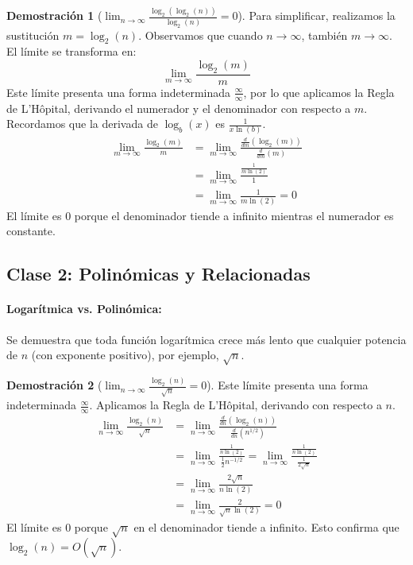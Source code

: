 \documentclass[12pt, a4paper]{article}
\theoremstyle{definition}
\newtheorem{demo}{Demostración}
\begin{document}
\begin{demo}[$\lim_{n \to \infty} \frac{\log_2(\log_2(n))}{\log_2(n)} = 0$]
Para simplificar, realizamos la sustitución $m = \log_2(n)$. Observamos que cuando $n \to \infty$, también $m \to \infty$. El límite se transforma en:
\[ \lim_{m \to \infty} \frac{\log_2(m)}{m} \]
Este límite presenta una forma indeterminada $\frac{\infty}{\infty}$, por lo que aplicamos la Regla de L'Hôpital, derivando el numerador y el denominador con respecto a $m$. Recordamos que la derivada de $\log_b(x)$ es $\frac{1}{x \ln(b)}$.
\begin{align*}
    \lim_{m \to \infty} \frac{\log_2(m)}{m} &= \lim_{m \to \infty} \frac{\frac{d}{dm}(\log_2(m))}{\frac{d}{dm}(m)} \\
    &= \lim_{m \to \infty} \frac{\frac{1}{m \ln(2)}}{1} \\
    &= \lim_{m \to \infty} \frac{1}{m \ln(2)} = 0
\end{align*}
El límite es 0 porque el denominador tiende a infinito mientras el numerador es constante.
\end{demo}

\subsection{Clase 2: Polinómicas y Relacionadas}

\paragraph{Logarítmica vs. Polinómica:} Se demuestra que toda función logarítmica crece más lento que cualquier potencia de $n$ (con exponente positivo), por ejemplo, $\sqrt{n}$.

\begin{demo}[$\lim_{n \to \infty} \frac{\log_2(n)}{\sqrt{n}} = 0$]
Este límite presenta una forma indeterminada $\frac{\infty}{\infty}$. Aplicamos la Regla de L'Hôpital, derivando con respecto a $n$.
\begin{align*}
    \lim_{n \to \infty} \frac{\log_2(n)}{\sqrt{n}} &= \lim_{n \to \infty} \frac{\frac{d}{dn}(\log_2(n))}{\frac{d}{dn}(n^{1/2})} \\
    &= \lim_{n \to \infty} \frac{\frac{1}{n \ln(2)}}{\frac{1}{2}n^{-1/2}} = \lim_{n \to \infty} \frac{\frac{1}{n \ln(2)}}{\frac{1}{2\sqrt{n}}} \\
    &= \lim_{n \to \infty} \frac{2\sqrt{n}}{n \ln(2)} \\
    &= \lim_{n \to \infty} \frac{2}{\sqrt{n} \ln(2)} = 0
\end{align*}
El límite es 0 porque $\sqrt{n}$ en el denominador tiende a infinito. Esto confirma que $\log_2(n) = O(\sqrt{n})$.
\end{demo}
\end{document}
